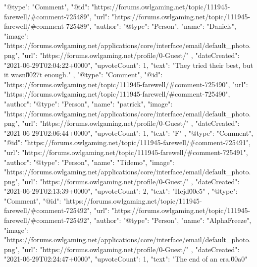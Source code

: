 {        {
            "@type": "Comment",
            "@id": "https://forums.owlgaming.net/topic/111945-farewell/#comment-725489",
            "url": "https://forums.owlgaming.net/topic/111945-farewell/#comment-725489",
            "author": {
                "@type": "Person",
                "name": "Daniels",
                "image": "https://forums.owlgaming.net/applications/core/interface/email/default_photo.png",
                "url": "https://forums.owlgaming.net/profile/0-Guest/"
            },
            "dateCreated": "2021-06-29T02:04:22+0000",
            "upvoteCount": 1,
            "text": "They tried their best, but it wasn\u0027t enough.\n \n"
        },
        {
            "@type": "Comment",
            "@id": "https://forums.owlgaming.net/topic/111945-farewell/#comment-725490",
            "url": "https://forums.owlgaming.net/topic/111945-farewell/#comment-725490",
            "author": {
                "@type": "Person",
                "name": "patrick",
                "image": "https://forums.owlgaming.net/applications/core/interface/email/default_photo.png",
                "url": "https://forums.owlgaming.net/profile/0-Guest/"
            },
            "dateCreated": "2021-06-29T02:06:44+0000",
            "upvoteCount": 1,
            "text": "F\n \n"
        },
        {
            "@type": "Comment",
            "@id": "https://forums.owlgaming.net/topic/111945-farewell/#comment-725491",
            "url": "https://forums.owlgaming.net/topic/111945-farewell/#comment-725491",
            "author": {
                "@type": "Person",
                "name": "Tidemo",
                "image": "https://forums.owlgaming.net/applications/core/interface/email/default_photo.png",
                "url": "https://forums.owlgaming.net/profile/0-Guest/"
            },
            "dateCreated": "2021-06-29T02:13:39+0000",
            "upvoteCount": 2,
            "text": "Hejd\u00e5\n \n"
        },
        {
            "@type": "Comment",
            "@id": "https://forums.owlgaming.net/topic/111945-farewell/#comment-725492",
            "url": "https://forums.owlgaming.net/topic/111945-farewell/#comment-725492",
            "author": {
                "@type": "Person",
                "name": "AlphaFreeze",
                "image": "https://forums.owlgaming.net/applications/core/interface/email/default_photo.png",
                "url": "https://forums.owlgaming.net/profile/0-Guest/"
            },
            "dateCreated": "2021-06-29T02:24:47+0000",
            "upvoteCount": 1,
            "text": "The end of an era.\u00a0\n \n"
}}
